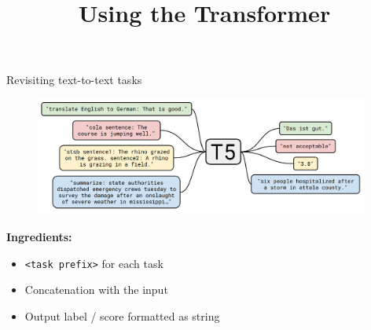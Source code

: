 


\usepackage{movie15}
\usepackage{animate}

\newcommand{\titlefigure}{figure/sesamestreet.jpeg}
\newcommand{\learninggoals}{
\item shortcomings of BERT \& Co.
\item everything as text-to-text
\item Dynamic Masking}

\title{Using the Transformer}
\date{}




\begin{frame}{Revisiting text-to-text tasks}

\vfill
	
	\begin{figure}
		\centering
		\includegraphics[width = 11cm]{figure/t5.png}\\ 
	\end{figure}
	
\textbf{Ingredients:}
	
\begin{itemize}
	\item \texttt{<task prefix>} for each task
	\item[] Concatenation with the input
	\item Output label / score formatted as string
\end{itemize}
	
\vfill

\end{frame}


